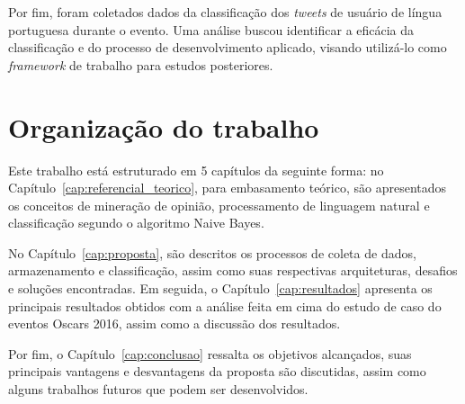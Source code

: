 Por fim, foram coletados dados da classificação dos \textit{tweets} de usuário de língua portuguesa durante o evento. Uma análise buscou identificar a eficácia da classificação e do processo de desenvolvimento aplicado, visando utilizá-lo como \textit{framework} de trabalho para estudos posteriores.


\section{Organização do trabalho}

Este trabalho está estruturado em 5 capítulos da seguinte forma: no Capítulo~\ref{cap:referencial_teorico}, para embasamento teórico, são apresentados os conceitos de mineração de opinião, processamento de linguagem natural e classificação segundo o algoritmo Naive Bayes. 

No Capítulo~\ref{cap:proposta}, são descritos os processos de coleta de dados, armazenamento e classificação, assim como suas respectivas arquiteturas, desafios e soluções encontradas. Em seguida, o Capítulo~\ref{cap:resultados} apresenta os principais resultados obtidos com a análise feita em cima do estudo de caso do eventos Oscars 2016, assim como a discussão dos resultados. 

Por fim, o Capítulo~\ref{cap:conclusao} ressalta os objetivos alcançados, suas principais vantagens e desvantagens da proposta são discutidas, assim como alguns trabalhos futuros que podem ser desenvolvidos. 

